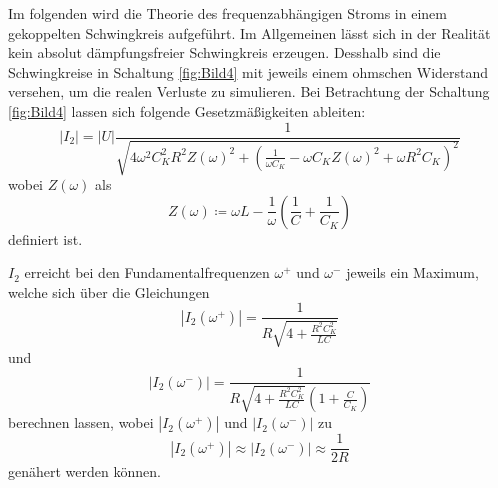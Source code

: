 Im folgenden wird die Theorie des frequenzabhängigen Stroms in einem gekoppelten Schwingkreis aufgeführt.
Im Allgemeinen lässt sich in der Realität kein absolut dämpfungsfreier Schwingkreis erzeugen. Desshalb sind die Schwingkreise in Schaltung \ref{fig:Bild4}
mit jeweils einem ohmschen Widerstand versehen, um die realen Verluste zu simulieren. Bei Betrachtung der Schaltung \ref{fig:Bild4} lassen sich folgende 
Gesetzmäßigkeiten ableiten:
\begin{equation}
    \left|I_2\right|=\left|U\right|\frac{1}{\sqrt{4\omega^2C_K^2R^2Z(\omega)^2+\left(\frac{1}{\omega C_K}-\omega C_KZ(\omega)^2+\omega R^2C_K\right)^2}}
\end{equation}
wobei $Z(\omega)$ als
\begin{equation}
    Z(\omega)\coloneq \omega L-\frac{1}{\omega}\left(\frac{1}{C}+\frac{1}{C_K}\right)
\end{equation}
definiert ist.

$I_2$ erreicht bei den Fundamentalfrequenzen $\omega^+$ und $\omega^-$ jeweils ein Maximum, welche sich über die Gleichungen
\begin{equation}
    \left|I_2(\omega^+)\right|=\frac{1}{R\sqrt{4+\frac{R^2C_K^2}{LC}}}
\end{equation}
und 
\begin{equation}
    \left|I_2(\omega^-)\right|=\frac{1}{R\sqrt{4+\frac{R^2C_K^2}{LC}}\left(1+\frac{C}{C_K}\right)}
\end{equation}
berechnen lassen, wobei  $\left|I_2(\omega^+)\right|$ und $\left|I_2(\omega^-)\right|$ zu
\begin{equation}
    \left|I_2(\omega^+)\right|\approx\left|I_2(\omega^-)\right|\approx \frac{1}{2R}
\end{equation}
genähert werden können.



